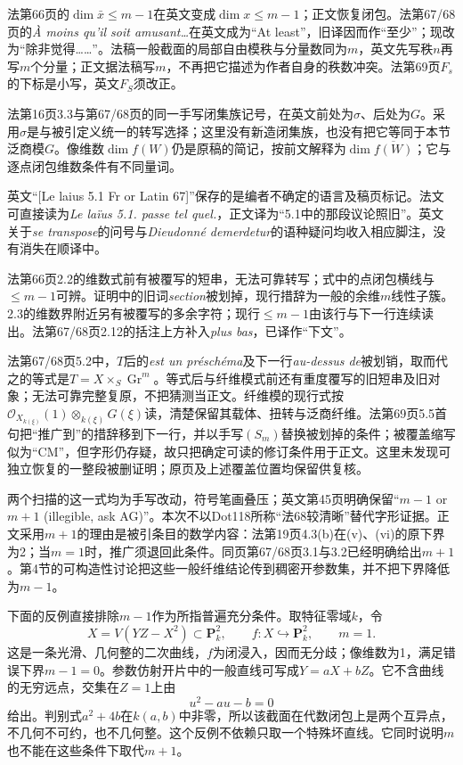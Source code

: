 法第66页的$\dim\bar x\leq m-1$在英文变成$\dim x\leq m-1$；正文恢复闭包。法第67/68页的\emph{\`A moins qu'il soit amusant\ldots}在英文成为“At least”，旧译因而作“至少”；现改为“除非觉得……”。法稿一般截面的局部自由模秩与分量数同为$m$，英文先写秩$n$再写$m$个分量；正文据法稿写$m$，不再把它描述为作者自身的秩数冲突。法第69页$F_s$的下标是小写，英文$F_S$须改正。

法第16页3.3与第67/68页的同一手写闭集族记号，在英文前处为$\sigma$、后处为$G$。采用$\sigma$是与被引定义统一的转写选择；这里没有新造闭集族，也没有把它等同于本节泛商模$G$。像维数$\dim f(W)$仍是原稿的简记，按前文解释为$\dim\overline{f(W)}$；它与逐点闭包维数条件有不同量词。

英文“[Le laius 5.1 Fr or Latin 67]”保存的是编者不确定的语言及稿页标记。法文可直接读为\emph{Le la\"ius 5.1. passe tel quel.}，正文译为“5.1中的那段议论照旧”。英文关于\emph{se transpose}的问号与\emph{Dieudonn\'e demerdetur}的语种疑问均收入相应脚注，没有消失在顺译中。

法第66页2.2的维数式前有被覆写的短串，无法可靠转写；式中的点闭包横线与$\leq m-1$可辨。证明中的旧词\emph{section}被划掉，现行措辞为一般的余维$m$线性子簇。2.3的维数界附近另有被覆写的多余字符；现行$\leq m-1$由该行与下一行连续读出。法第67/68页2.12的括注上方补入\emph{plus bas}，已译作“下文”。

法第67/68页5.2中，$T$后的\emph{est un pr\'esch\'ema}及下一行\emph{au-dessus de}被划销，取而代之的等式是$T=X\times_S\operatorname{Gr}^m$。等式后与纤维模式前还有重度覆写的旧短串及旧对象；无法可靠完整复原，不把猜测当正文。纤维模的现行式按$\mathcal O_{X_{k(\xi)}}(1)\otimes_{k(\xi)}G(\xi)$读，清楚保留其载体、扭转与泛商纤维。法第69页5.5首句把“推广到”的措辞移到下一行，并以手写$(S_m)$替换被划掉的条件；被覆盖缩写似为“CM”，但字形仍存疑，故只把确定可读的修订条件用于正文。这里未发现可独立恢复的一整段被删证明；原页及上述覆盖位置均保留供复核。

两个扫描的这一式均为手写改动，符号笔画叠压；英文第45页明确保留“$m-1$ or $m+1$ (illegible, ask AG)”。本次不以Dot118所称“法68较清晰”替代字形证据。正文采用$m+1$的理由是被引条目的数学内容：法第19页4.3(b)在(v)、(vi)的原下界为2；当$m=1$时，推广须退回此条件。同页第67/68页3.1与3.2已经明确给出$m+1$。第4节的可构造性讨论把这些一般纤维结论传到稠密开参数集，并不把下界降低为$m-1$。

下面的反例直接排除$m-1$作为所指普遍充分条件。取特征零域$k$，令
\[
 X=V(YZ-X^2)\subset\mathbf P^2_k,
 \qquad f:X\hookrightarrow\mathbf P^2_k,
 \qquad m=1.
\]
这是一条光滑、几何整的二次曲线，$f$为闭浸入，因而无分歧；像维数为1，满足错误下界$m-1=0$。参数仿射开片中的一般直线可写成$Y=aX+bZ$。它不含曲线的无穷远点，交集在$Z=1$上由
\[
 u^2-au-b=0
\]
给出。判别式$a^2+4b$在$k(a,b)$中非零，所以该截面在代数闭包上是两个互异点，不几何不可约，也不几何整。这个反例不依赖只取一个特殊坏直线。它同时说明$m$也不能在这些条件下取代$m+1$。


